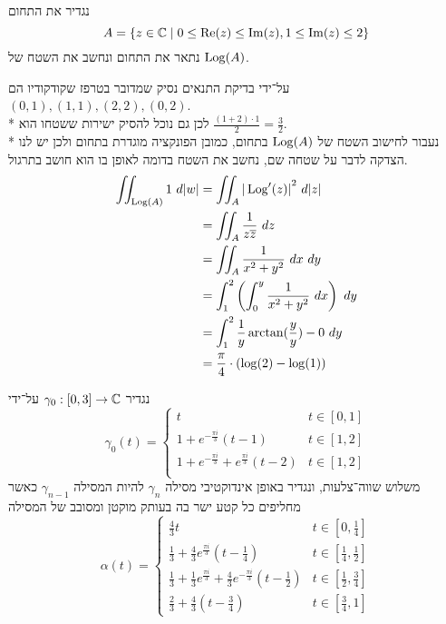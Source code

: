 \question{}
נגדיר את התחום
\[
	A = \{z \in \mathbb{C} \mid 0 \le \operatorname{Re}(z) \le \operatorname{Im}(z), 1 \le \operatorname{Im}(z) \le 2\}
\]
נתאר את התחום ונחשב את השטח של $\operatorname{Log}(A)$.
\begin{solution}
	על־ידי בדיקת התנאים נסיק שמדובר בטרפז שקודקודיו הם $(0, 1), (1, 1), (2, 2), (0, 2)$. \\*
	לכן גם נוכל להסיק ישירות ששטחו הוא $\frac{(1 + 2) \cdot 1}{2} = \frac{3}{2}$. \\*
	נעבור לחישוב השטח של $\operatorname{Log}(A)$ בתחום, כמובן הפונקציה מוגדרת בתחום ולכן יש לנו הצדקה לדבר על שטחה שם, נחשב את השטח בדומה לאופן בו הוא חושב בתרגול.
	\begin{align*}
		\iint_{\Log(A)} 1\ d|w|
		& = \iint_A {|\Log'(z)|}^2\ d|z| \\
		& = \iint_A \frac{1}{z \overline{z}}\ dz \\
		& = \iint_A \frac{1}{x^2 + y^2}\ dx\ dy \\
		& = \int_1^2 \left(\int_0^y \frac{1}{x^2 + y^2}\ dx\right)\ dy \\
		& = \int_1^2 \frac{1}{y} \arctan(\frac{y}{y}) - 0\ dy \\
		& = \frac{\pi}{4} \cdot (\log(2) - \log(1))
	\end{align*}
\end{solution}

\question{}
נגדיר $\gamma_0 : [0, 3] \to \mathbb{C}$ על־ידי
\[
	\gamma_0(t) = \begin{cases}
		t & t \in [0, 1] \\
		1 + e^{-\frac{\pi i}{3}} (t - 1) & t \in [1, 2] \\
		1 + e^{-\frac{\pi i}{3}} + e^{\frac{\pi i}{3}} (t - 2) & t \in [1, 2] \\
	\end{cases}
\]
משלוש שווה־צלעות, ונגדיר באופן אינדוקטיבי מסילה $\gamma_n$ להיות המסילה $\gamma_{n - 1}$ כאשר מחליפים כל קטע ישר בה בעותק מוקטן ומסובב של המסילה
\[
	\alpha(t) = \begin{cases}
		\frac{4}{3} t & t \in [0, \frac{1}{4}] \\
		\frac{1}{3} + \frac{4}{3} e^{\frac{\pi i}{3}} (t - \frac{1}{4}) & t \in [\frac{1}{4}, \frac{1}{2}] \\
		\frac{1}{3} + \frac{1}{3} e^{\frac{\pi i}{3}} + \frac{4}{3} e^{-\frac{\pi i}{3}} (t - \frac{1}{2}) & t \in [\frac{1}{2}, \frac{3}{4}] \\
		\frac{2}{3} + \frac{4}{3} (t - \frac{3}{4}) & t \in [\frac{3}{4}, 1]
	\end{cases}
\]

